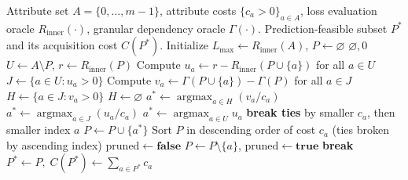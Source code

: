 \begin{algorithm}[htbp]
	\caption{Dependency-Guided Prediction-Feasible Reduction}
	\label{alg3:guided}
	\begin{algorithmic}[1]
		\Require Attribute set $A=\{0,\ldots,m-1\}$, attribute costs $\{c_a > 0\}_{a \in A}$, loss evaluation oracle $R_{\mathrm{inner}}(\cdot)$, granular dependency oracle $\Gamma(\cdot)$.
		\Ensure Prediction-feasible subset $P^*$ and its acquisition cost $C(P^*)$.
		\State Initialize $L_{\max} \gets R_{\mathrm{inner}}(A)$, $P \gets \varnothing$
		\State \Return $\varnothing, 0$ 
		\EndIf
		 
		\State $U \gets A \setminus P$, \quad $r \gets R_{\mathrm{inner}}(P)$
		\State Compute $u_a \gets r - R_{\mathrm{inner}}(P \cup \{a\})$ for all $a \in U$
		\State $J \gets \{a \in U : u_a > 0\}$
		\State Compute $v_a \gets \Gamma(P \cup \{a\}) - \Gamma(P)$ for all $a \in J$
		\State $H \gets \{a \in J : v_a > 0\}$
		\Else
		\State $H \gets \varnothing$
		\EndIf
		\State $a^* \gets \operatorname{argmax}_{a \in H} (v_a / c_a)$ 
		\State $a^* \gets \operatorname{argmax}_{a \in J} (u_a / c_a)$ 
		\Else
		\State $a^* \gets \operatorname{argmax}_{a \in U} u_a$ 
		\EndIf
		\State \textbf{break ties} by smaller $c_a$, then smaller index $a$
		\State $P \gets P \cup \{a^*\}$
		\EndWhile
		\Repeat {}
		\State Sort $P$ in descending order of cost $c_a$ (ties broken by ascending index)
		\State $\mathrm{pruned} \gets \textbf{false}$
		\State $P \gets P \setminus \{a\}$, \quad $\mathrm{pruned} \gets \textbf{true}$
		\State \textbf{break} 
		\EndIf
		\EndFor
		\State \Return $P^* \gets P, \; C(P^*) \gets \sum_{a \in P^*} c_a$
	\end{algorithmic}
\end{algorithm}